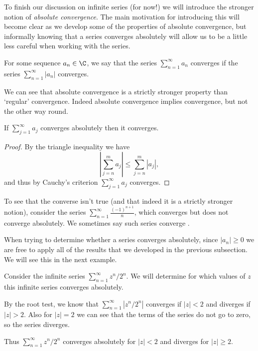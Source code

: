 To finish our discussion on infinite series (for now!) we will introduce the stronger notion of \emph{absolute convergence}. The main motivation for introducing this will become clear as we develop some of the properties of absolute convergence, but informally knowing that a series converges absolutely will allow us to be a little less careful when working with the series.

\begin{definition}
	For some sequence $a_n \in \C$, we say that the series $\sum_{n = 1}^{\infty} a_n$ converges  if the series $\sum_{n = 1}^{\infty} |a_n|$ converges. 
\end{definition}

We can see that absolute convergence is a strictly stronger property than `regular' convergence. Indeed absolute convergence implies convergence, but not the other way round.

\begin{theorem}
	If $\sum_{j = 1}^{\infty} a_j$ converges absolutely then it converges.
\end{theorem}
\begin{proof}
	By the triangle inequality we have
	$$
	\left|\sum_{j = n}^m a_j\right| \leq \sum_{j = n}^m \left|a_j\right|,
	$$
	and thus by Cauchy's criterion $\sum_{j = 1}^{\infty} a_j$ converges.
\end{proof}

To see that the converse isn't true (and that indeed it is a strictly stronger notion), consider the series $\sum_{n = 1}^{\infty} \frac{(-1)^{n + 1}}{n}$, which converges but does not converge absolutely. We sometimes say such series converge . 

When trying to determine whether a series converges absolutely, since $|a_n| \geq 0$ we are free to apply all of the results that we developed in the previous subsection. We will see this in the next example.

\begin{example}
	Consider the infinite series $\sum_{n = 1}^{\infty} z^n/2^n$. We will determine for which values of $z$ this infinite series converges absolutely.
	
	By the root test, we know that $\sum_{n = 1}^{\infty} |z^n/2^n|$ converges if $|z| < 2$ and diverges if $|z| > 2$. Also for $|z| = 2$ we can see that the terms of the series do not go to zero, so the series diverges.

	Thus $\sum_{n = 1}^{\infty} z^n/2^n$ converges absolutely for $|z| < 2$ and diverges for $|z| \geq 2$.
\end{example}

